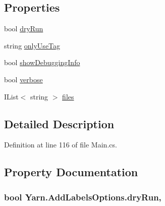 \subsection*{Properties}
\begin{DoxyCompactItemize}
\item 
bool \hyperlink{a00027_a5dc9d9db767738237e988f95fc0330f4}{dry\-Run}
\item 
string \hyperlink{a00027_ab6162338f9606a836f3101fe0e228249}{only\-Use\-Tag}
\item 
bool \hyperlink{a00031_a89964ea17bd19caf00cb5bff563ed01c}{show\-Debugging\-Info}
\item 
bool \hyperlink{a00031_ada4d83d1756918f362d55f6649b82b17}{verbose}
\item 
I\-List$<$ string $>$ \hyperlink{a00031_aa93cbb1bc1d5328e0a417012621e92d2}{files}
\end{DoxyCompactItemize}


\subsection{Detailed Description}


Definition at line 116 of file Main.\-cs.



\subsection{Property Documentation}
\hypertarget{a00027_a5dc9d9db767738237e988f95fc0330f4}{
\subsubsection[{dry\-Run}]{\setlength{\rightskip}{0pt plus 5cm}bool Yarn.\-Add\-Labels\-Options.\-dry\-Run\hspace{0.3cm}{\ttfamily [get]}, {\ttfamily [set]}}}\label{a00027_a5dc9d9db767738237e988f95fc0330f4}


